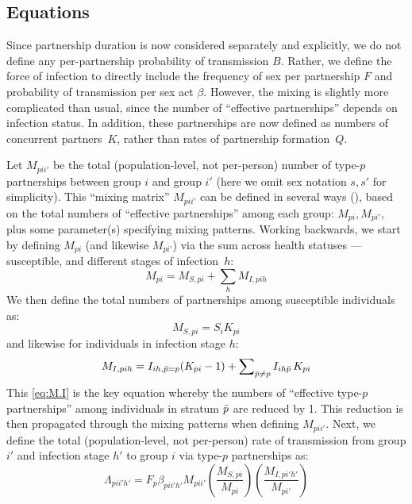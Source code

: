 \subsection{Equations}\label{foi.prop.eq}
Since partnership duration is now considered separately and explicitly,
we do not define any per-partnership probability of transmission $B$.
Rather, we define the force of infection to directly include
the frequency of sex per partnership $F$ and probability of transmission per sex act $\beta$.
However, the mixing is slightly more complicated than usual,
since the number of ``effective partnerships'' depends on infection status.
In addition, these partnerships are now defined as numbers of concurrent partners~$K$,
rather than rates of partnership formation~$Q$.
\par
Let $M_{pii'}$ be the total (population-level, not per-person)
number of type-$p$ partnerships between group $i$ and group $i'$
(here we omit sex notation $s,s'$ for simplicity).
This ``mixing matrix'' $M_{pii'}$ can be defined in several ways (\eg {}),
based on the total numbers of ``effective partnerships'' among each group: $M_{pi}, M_{pi'}$,
plus some parameter(s) specifying mixing patterns.
Working backwards, we start by defining $M_{pi}$ (and likewise $M_{pi'}$) via
the sum across health statuses --- \ie susceptible, and different stages of infection~$h$:
\begin{equation}\label{eq:M.SI}
  M_{pi} = M_{S,pi} + \sum_h M_{I,pih}
\end{equation}
We then define the total numbers of partnerships among susceptible individuals as:
\begin{equation}\label{eq:M.S}
  M_{S,pi} = S_{i} K_{pi}
\end{equation}
and likewise for individuals in infection stage $h$:
\begin{equation}\label{eq:M.I}
  M_{I,pih} = I_{ih,\bar{p}=p} (K_{pi}-1) + \sum\nolimits_{\bar{p} \ne p} I_{ih\bar{p}}\,K_{pi}
\end{equation}
This \eqref{eq:M.I} is the key equation whereby
the  numbers of ``effective type-$p$ partnerships'' among
individuals in stratum $\bar{p}$ are reduced by 1.
This reduction is then propagated through the mixing patterns when defining $M_{pii'}$.
Next, we define the total (population-level, not per-person) rate of transmission
from group $i'$ and infection stage $h'$ to group $i$ via type-$p$ partnerships as:
\begin{equation}
  \Lambda_{pii'h'} = F_p \beta_{pii'h'} M_{pii'}
  \left(\frac{M_{S,pi}}{M_{pi}}\right)
  \left(\frac{M_{I,pi'h'}}{M_{pi'}}\right)
\end{equation}
